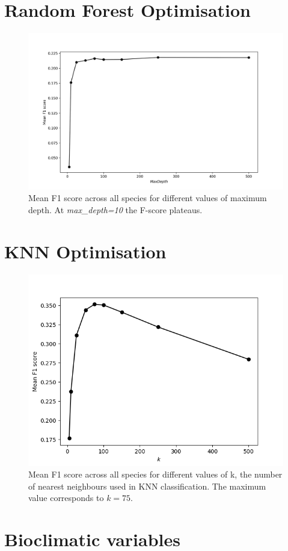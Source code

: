 \section{Random Forest Optimisation}\label{appendix:RFF1}

\begin{figure}[H]
\centering
\includegraphics[width = .6\textwidth]{Images/Appendix.png}
\caption{Mean F1 score across all species for different values of maximum depth. At \textit{max\_depth=10} the F-score plateaus.}
\label{RFF1}
\end{figure}


\section{KNN Optimisation} \label{appendix:KNNF1}

\begin{figure}[H]
\centering
\includegraphics[width = .6\textwidth]{Images/knn_f1_scores.png}
\caption{Mean F1 score across all species for different values of k, the number of nearest neighbours used in KNN classification. The maximum value corresponds to $k = 75$.}
\label{KNNF1}
\end{figure}




\section{Bioclimatic variables} \label{appendix:bio}

